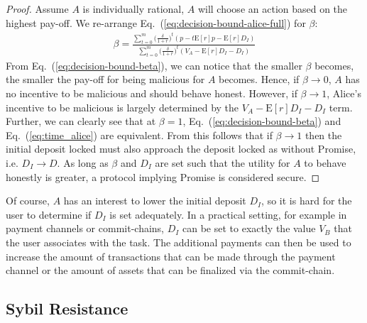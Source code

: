 \documentclass[runningheads]{llncs}
\newcommand{\sys}{Promise\xspace}
\begin{document}
\begin{proof}
Assume $A$ is individually rational, $A$ will choose an action based on the highest pay-off.
We re-arrange Eq.~(\ref{eq:decision-bound-alice-full}) for $\beta$:
\begin{align}
    \label{eq:decision-bound-beta}
    \beta = \frac{\sum_{t=0}^{m} \big( \frac{\delta}{1+r} \big)^{t} ( p - t\mathrm{E}[r]p -\mathrm{E}[r]D_{I})}{\sum_{t=0}^{m} \big( \frac{\delta}{1+r} \big)^{t} (V_A - \mathrm{E}[r]D_{I}-D_{I})} 
\end{align}
From Eq.~(\ref{eq:decision-bound-beta}), we can notice that the smaller $\beta$ becomes, the smaller the pay-off for being malicious for $A$ becomes.
Hence, if $\beta \to 0$, $A$ has no incentive to be malicious and should behave honest.
However, if $\beta \to 1$, Alice's incentive to be malicious is largely determined by the $V_A-\mathrm{E}[r]D_I - D_I$ term.
Further, we can clearly see that at $\beta=1$, Eq.~(\ref{eq:decision-bound-beta}) and Eq.~(\ref{eq:time_alice}) are equivalent.
From this follows that if $\beta \to 1$ then the initial deposit locked must also approach the deposit locked as without \sys, i.e. $D_I \to D$.
As long as $\beta$ and $D_I$ are set such that the utility for $A$ to behave honestly is greater, a protocol implying \sys is considered secure.
\end{proof}


Of course, $A$ has an interest to lower the initial deposit $D_I$, so it is hard for the user to determine if $D_I$ is set adequately.
In a practical setting, for example in payment channels or commit-chains, $D_I$ can be set to exactly the value $V_B$ that the user associates with the task.
The additional payments can then be used to increase the amount of transactions that can be made through the payment channel or the amount of assets that can be finalized via the commit-chain.


% 

\subsection{Sybil Resistance}
\end{document}
